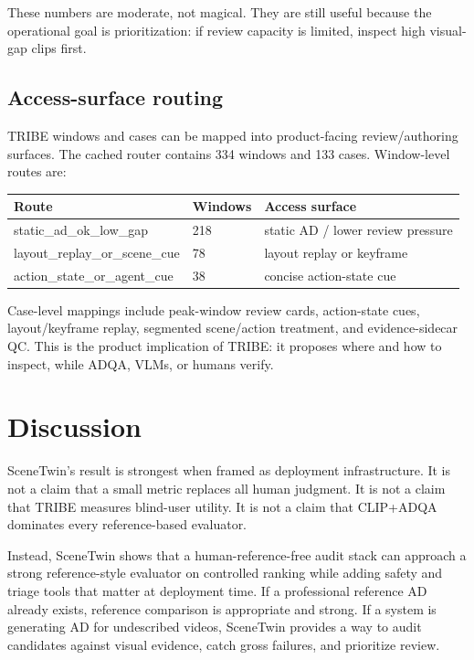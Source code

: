 \documentclass[10pt,twocolumn]{article}
\begin{document}
These numbers are moderate, not magical. They are still useful because the operational goal is prioritization: if review capacity is limited, inspect high visual-gap clips first.


\subsection{Access-surface routing}

TRIBE windows and cases can be mapped into product-facing review/authoring surfaces. The cached router contains 334 windows and 133 cases. Window-level routes are:


\begin{table}[t]
\centering
\small
\begin{tabular}{@{}lll@{}}
\toprule
Route & Windows & Access surface \\
\midrule
static\_ad\_ok\_low\_gap & 218 & static AD / lower review pressure \\
layout\_replay\_or\_scene\_cue & 78 & layout replay or keyframe \\
action\_state\_or\_agent\_cue & 38 & concise action-state cue \\
\bottomrule
\end{tabular}
\end{table}

Case-level mappings include peak-window review cards, action-state cues, layout/keyframe replay, segmented scene/action treatment, and evidence-sidecar QC. This is the product implication of TRIBE: it proposes where and how to inspect, while ADQA, VLMs, or humans verify.


\section{Discussion}


SceneTwin's result is strongest when framed as deployment infrastructure. It is not a claim that a small metric replaces all human judgment. It is not a claim that TRIBE measures blind-user utility. It is not a claim that CLIP+ADQA dominates every reference-based evaluator.


Instead, SceneTwin shows that a human-reference-free audit stack can approach a strong reference-style evaluator on controlled ranking while adding safety and triage tools that matter at deployment time. If a professional reference AD already exists, reference comparison is appropriate and strong. If a system is generating AD for undescribed videos, SceneTwin provides a way to audit candidates against visual evidence, catch gross failures, and prioritize review.
\end{document}
